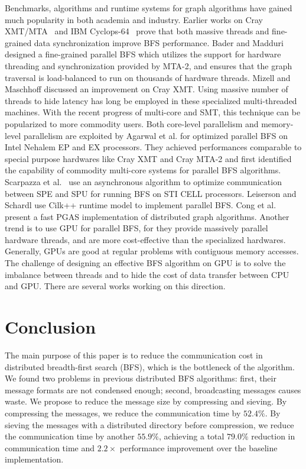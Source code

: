\documentclass[conference]{IEEEtran}
\begin{document}
Benchmarks, algorithms and runtime systems for graph algorithms have gained
much popularity in both academia and industry.  Earlier works on Cray
XMT/MTA~\cite{Bader:2006:MTA,Mizell:2009} and IBM
Cyclops-64~\cite{tan-cyclops64} prove that both massive threads and
fine-grained data synchronization improve BFS performance.  Bader and Madduri
\cite{Bader:2006:MTA} designed a fine-grained parallel BFS which utilizes the
support for hardware threading and synchronization provided by MTA-2, and
ensures that the graph traversal is load-balanced to run on thousands of
hardware threads. Mizell and Maschhoff \cite{Mizell:2009} discussed an
improvement on Cray XMT. Using massive number of threads to hide latency has
long be employed in these specialized multi-threaded machines. With the recent
progress of multi-core and SMT, this technique can be popularized to more
commodity users. Both core-level parallelism and memory-level parallelism are
exploited by Agarwal et al. \cite{Agarwal:2010} for optimized parallel BFS on
Intel Nehalem EP and EX processors. They achieved performances comparable to
special purpose hardwares like Cray XMT and Cray MTA-2 and first identified
the capability of commodity multi-core systems for parallel BFS algorithms.
Scarpazza et al.~\cite{Scarpazza:Cell} use an asynchronous algorithm to
optimize communication between SPE and SPU for running BFS on STI CELL
processors.  Leiserson and Schardl \cite{Leiserson:2010} use Cilk++ runtime
model to implement parallel BFS. Cong et al.~\cite{Cong:2010} present a fast
PGAS implementation of distributed graph algorithms. Another trend is to use
GPU for parallel BFS, for they provide massively parallel hardware threads,
and are more cost-effective than the specialized hardwares.  Generally, GPUs
are good at regular problems with contiguous memory accesses. The challenge of
designing an effective BFS algorithm on GPU is to solve the imbalance between
threads and to hide the cost of data transfer between CPU and GPU.  There are
several works \cite{Hong:2011,Harish-cuda,Luo:2010} working on this direction.





\section{Conclusion}
\label{sec:cls}

The main purpose of this paper is to reduce the communication cost in
distributed breadth-first search (BFS), which is the bottleneck of the
algorithm. We found two problems in previous distributed BFS algorithms:
first, their message formats are not condensed enough; second, broadcasting
messages causes waste.  We propose to reduce the message size by compressing
and sieving.  By compressing the messages, we reduce the communication time by
$52.4\%$.  By sieving the messages with a distributed directory before
compression, we reduce the communication time by another $55.9\%$, achieving a
total $79.0\%$ reduction in communication time and $2.2 \times$ performance
improvement over the baseline implementation.
\end{document}
